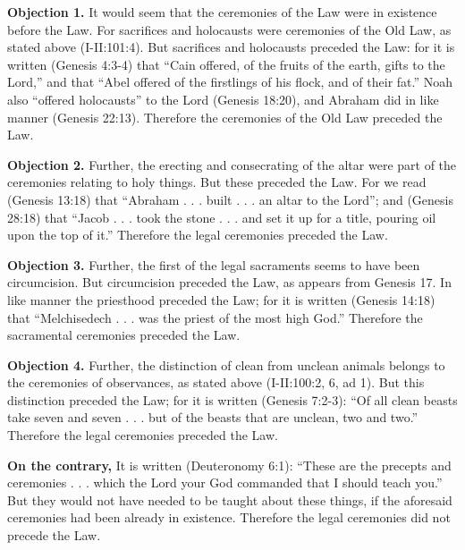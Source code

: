 
\textbf{Objection 1.} It would seem that the ceremonies of the Law were in existence before the Law. For sacrifices and holocausts were ceremonies of the Old Law, as stated above (I-II:101:4). But sacrifices and holocausts preceded the Law: for it is written (Genesis 4:3-4) that ``Cain offered, of the fruits of the earth, gifts to the Lord,'' and that ``Abel offered of the firstlings of his flock, and of their fat.'' Noah also ``offered holocausts'' to the Lord (Genesis 18:20), and Abraham did in like manner (Genesis 22:13). Therefore the ceremonies of the Old Law preceded the Law.

\textbf{Objection 2.} Further, the erecting and consecrating of the altar were part of the ceremonies relating to holy things. But these preceded the Law. For we read (Genesis 13:18) that ``Abraham . . . built . . . an altar to the Lord''; and (Genesis 28:18) that ``Jacob . . . took the stone . . . and set it up for a title, pouring oil upon the top of it.'' Therefore the legal ceremonies preceded the Law.

\textbf{Objection 3.} Further, the first of the legal sacraments seems to have been circumcision. But circumcision preceded the Law, as appears from Genesis 17. In like manner the priesthood preceded the Law; for it is written (Genesis 14:18) that ``Melchisedech . . . was the priest of the most high God.'' Therefore the sacramental ceremonies preceded the Law.

\textbf{Objection 4.} Further, the distinction of clean from unclean animals belongs to the ceremonies of observances, as stated above (I-II:100:2, 6, ad 1). But this distinction preceded the Law; for it is written (Genesis 7:2-3): ``Of all clean beasts take seven and seven . . . but of the beasts that are unclean, two and two.'' Therefore the legal ceremonies preceded the Law.

\textbf{On the contrary,} It is written (Deuteronomy 6:1): ``These are the precepts and ceremonies . . . which the Lord your God commanded that I should teach you.'' But they would not have needed to be taught about these things, if the aforesaid ceremonies had been already in existence. Therefore the legal ceremonies did not precede the Law.

